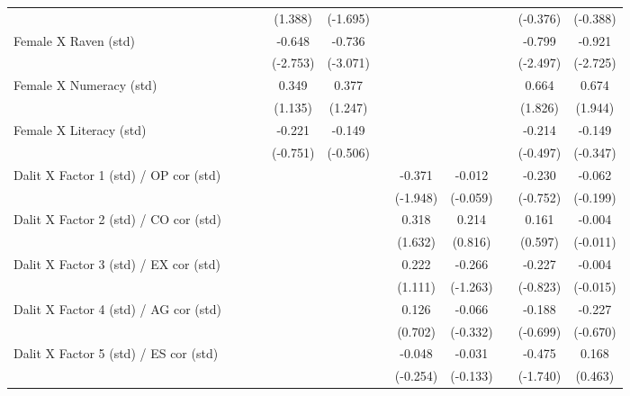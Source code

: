 {\begin{longtable}{@{\extracolsep{\fill}}lccccccccccc}
          &       &       &       & (1.388) & (-1.695) &       &       &       &       & (-0.376) & (-0.388) \\
    Female X Raven (std) &       &       &       & -0.648 & -0.736 &       &       &       &       & -0.799 & -0.921 \\
          &       &       &       & (-2.753) & (-3.071) &       &       &       &       & (-2.497) & (-2.725) \\
    Female X Numeracy (std) &       &       &       & 0.349 & 0.377 &       &       &       &       & 0.664 & 0.674 \\
          &       &       &       & (1.135) & (1.247) &       &       &       &       & (1.826) & (1.944) \\
    Female X Literacy (std) &       &       &       & -0.221 & -0.149 &       &       &       &       & -0.214 & -0.149 \\
          &       &       &       & (-0.751) & (-0.506) &       &       &       &       & (-0.497) & (-0.347) \\
    Dalit X Factor 1 (std) / OP cor (std) &       &       &       &       &       &       & -0.371 & -0.012 &       & -0.230 & -0.062 \\
          &       &       &       &       &       &       & (-1.948) & (-0.059) &       & (-0.752) & (-0.199) \\
    Dalit X Factor 2 (std) / CO cor (std) &       &       &       &       &       &       & 0.318 & 0.214 &       & 0.161 & -0.004 \\
          &       &       &       &       &       &       & (1.632) & (0.816) &       & (0.597) & (-0.011) \\
    Dalit X Factor 3 (std) / EX cor (std) &       &       &       &       &       &       & 0.222 & -0.266 &       & -0.227 & -0.004 \\
          &       &       &       &       &       &       & (1.111) & (-1.263) &       & (-0.823) & (-0.015) \\
    Dalit X Factor 4 (std) / AG cor (std) &       &       &       &       &       &       & 0.126 & -0.066 &       & -0.188 & -0.227 \\
          &       &       &       &       &       &       & (0.702) & (-0.332) &       & (-0.699) & (-0.670) \\
    Dalit X Factor 5 (std) / ES cor (std) &       &       &       &       &       &       & -0.048 & -0.031 &       & -0.475 & 0.168 \\
          &       &       &       &       &       &       & (-0.254) & (-0.133) &       & (-1.740) & (0.463) \\

\end{longtable}}
